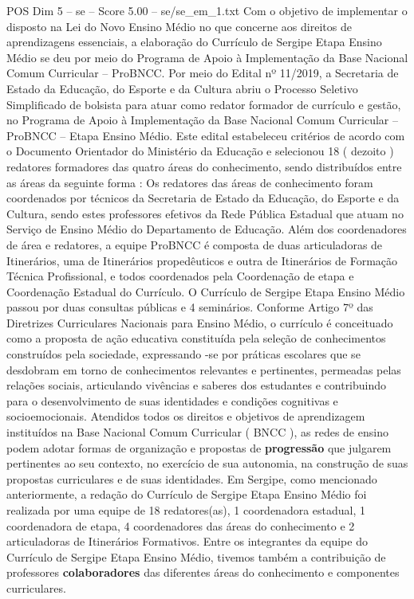 \begin{textsample}{POS Dim 5 – se – Score 5.00 – se/se\_em\_1.txt}
Com o objetivo de implementar o disposto na Lei do Novo Ensino Médio no que concerne aos direitos de aprendizagens essenciais, a elaboração do Currículo de Sergipe Etapa Ensino Médio se deu por meio do Programa de Apoio à Implementação da Base Nacional Comum Curricular – ProBNCC.
Por meio do Edital nº 11/2019, a Secretaria de Estado da Educação, do Esporte e da Cultura abriu o Processo Seletivo Simplificado de bolsista para atuar como redator formador de currículo e gestão, no Programa de Apoio à Implementação da Base Nacional Comum Curricular – ProBNCC – Etapa Ensino Médio.
Este edital estabeleceu critérios de acordo com o Documento Orientador do Ministério da Educação e selecionou 18 ( dezoito ) redatores formadores das quatro áreas do conhecimento, sendo distribuídos entre as áreas da seguinte forma : Os redatores das áreas de conhecimento foram coordenados por técnicos da Secretaria de Estado da Educação, do Esporte e da Cultura, sendo estes professores efetivos da Rede Pública Estadual que atuam no Serviço de Ensino Médio do Departamento de Educação.
Além dos coordenadores de área e redatores, a equipe ProBNCC é composta de duas articuladoras de Itinerários, uma de Itinerários propedêuticos e outra de Itinerários de Formação Técnica Profissional, e todos coordenados pela Coordenação de etapa e Coordenação Estadual do Currículo.
O Currículo de Sergipe Etapa Ensino Médio passou por duas consultas públicas e 4 seminários.
Conforme Artigo 7º das Diretrizes Curriculares Nacionais para Ensino Médio, o currículo é conceituado como a proposta de ação educativa constituída pela seleção de conhecimentos construídos pela sociedade, expressando -se por práticas escolares que se desdobram em torno de conhecimentos relevantes e pertinentes, permeadas pelas relações sociais, articulando vivências e saberes dos estudantes e contribuindo para o desenvolvimento de suas identidades e condições cognitivas e socioemocionais.
Atendidos todos os direitos e objetivos de aprendizagem instituídos na Base Nacional Comum Curricular ( BNCC ), as redes de ensino podem adotar formas de organização e propostas de \textbf{progressão} que julgarem pertinentes ao seu contexto, no exercício de sua autonomia, na construção de suas propostas curriculares e de suas identidades.
Em Sergipe, como mencionado anteriormente, a redação do Currículo de Sergipe Etapa Ensino Médio foi realizada por uma equipe de 18 redatores(as), 1 coordenadora estadual, 1 coordenadora de etapa, 4 coordenadores das áreas do conhecimento e 2 articuladoras de Itinerários Formativos.
Entre os integrantes da equipe do Currículo de Sergipe Etapa Ensino Médio, tivemos também a contribuição de professores \textbf{colaboradores} das diferentes áreas do conhecimento e componentes curriculares.

\end{textsample}
